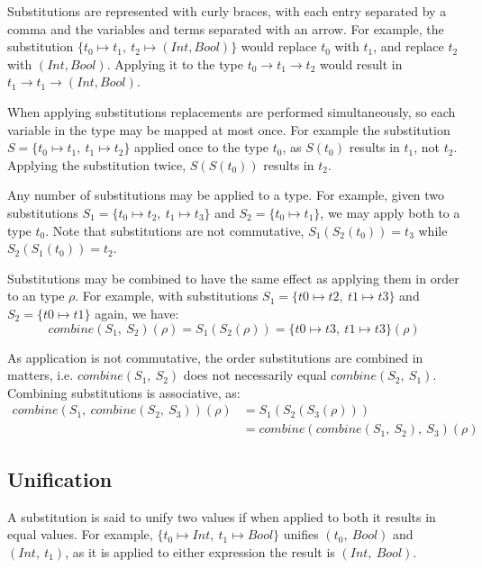\documentclass[a4paper,fleqn,oneside,12pt]{report}
\begin{document}
Substitutions are represented with curly braces, with each entry separated by a comma and the variables and terms separated with an arrow. For example, the substitution $\{ t_0 \mapsto t_1,\ t_2 \mapsto (Int, Bool) \}$ would replace $t_0$ with $t_1$, and replace $t_2$ with $(Int, Bool)$. Applying it to the type $t_0 \rightarrow t_1 \rightarrow t_2$ would result in $t_1 \rightarrow t_1 \rightarrow (Int, Bool)$.

When applying substitutions replacements are performed simultaneously, so each variable in the type may be mapped at most once. For example the substitution $S = \{ t_0 \mapsto t_1,\ t_1 \mapsto t_2 \}$ applied once to the type $t_0$, as $S(t_0)$ results in $t_1$, not $t_2$. Applying the substitution twice, $S(S(t_0))$ results in $t_2$.

Any number of substitutions may be applied to a type. For example, given two substitutions $S_1 = \{ t_0 \mapsto t_2,\ t_1 \mapsto t_3 \}$ and $S_2 = \{ t_0 \mapsto t_1 \}$, we may apply both to a type $t_0$. Note that substitutions are not commutative, $S_1(S_2(t_0)) = t_3$ while $S_2(S_1(t_0)) = t_2$.

Substitutions may be combined to have the same effect as applying them in order to an type $\rho$. For example, with substitutions $S_1 = \{ t0 \mapsto t2,\ t1 \mapsto t3 \}$ and $S_2 = \{ t0 \mapsto t1 \}$ again, we have:
$$\mathit{combine}(S_1,\ S_2)(\rho) = S_1(S_2(\rho)) = \{ t0 \mapsto t3,\ t1 \mapsto t3 \}(\rho)$$

As application is not commutative, the order substitutions are combined in matters, i.e. $\mathit{combine}(S_1,\ S_2)$ does not necessarily equal $\mathit{combine}(S_2,\ S_1)$. Combining substitutions is associative, as:
\begin{align*}
  \mathit{combine}(S_1,\ \mathit{combine}(S_2,\ S_3))(\rho) & = S_1(S_2(S_3(\rho)))\\& = \mathit{combine}(\mathit{combine}(S_1,\ S_2),\ S_3)(\rho)
\end{align*}

\subsection{Unification}

A substitution is said to unify two values if when applied to both it results in equal values. For example, $\{ t_0 \mapsto Int,\ t_1 \mapsto Bool \}$ unifies $(t_0,\ Bool)$ and $(Int,\ t_1)$, as it is applied to either expression the result is $(Int,\ Bool)$.
\end{document}

